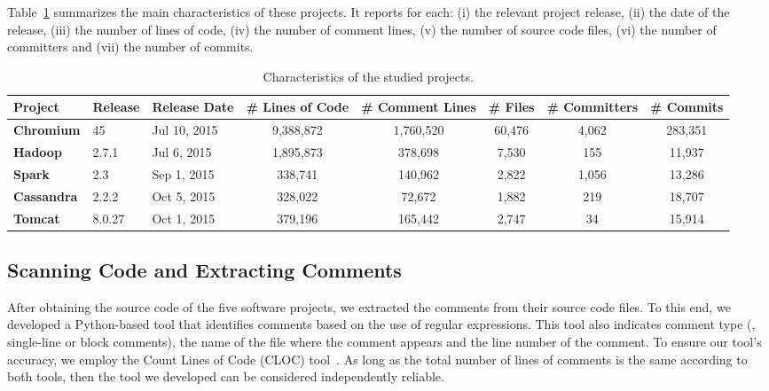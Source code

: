 Table~\ref{table:projects_statistics} summarizes the main characteristics of these projects. It reports for each: (i) the relevant project release, (ii) the date of the release, (iii) the number of lines of code, (iv)  the number of comment lines, (v)  the number of source code files, (vi)  the number of committers and (vii) the number of commits.

	
\begin{table}[t]


		\centering
		\caption{Characteristics of the studied projects.}
				\begin{adjustbox}{width=1.0\textwidth}
		\begin{tabular}{l|ll|ccccc}
			\hline
			\textbf{Project}  & \textbf{Release} & \textbf{ Release Date}  & \textbf{\# Lines of Code} & \textbf{\# Comment Lines} & \textbf{\# Files} & \textbf{\# Committers} & \textbf{\# Commits} \\ \hline
			\textbf{Chromium} &   45    & Jul 10, 2015 &  9,388,872   &    1,760,520    & 60,476 &    4,062    & 283,351  \\ \hline
			\textbf{Hadoop} &   2.7.1    & Jul 6, 2015 &  1,895,873   &    378,698    & 7,530 &    155    & 11,937  \\ \hline
			\textbf{Spark} &   2.3    & Sep 1, 2015 &  338,741   &    140,962    & 2,822 &    1,056    & 13,286  \\ \hline
			\textbf{Cassandra} &   2.2.2    & Oct 5, 2015 &  328,022   &    72,672    & 1,882 &    219    & 18,707  \\ \hline
			\textbf{Tomcat} &   8.0.27    & Oct 1, 2015 &  379,196   &    165,442    & 2,747 &    34    & 15,914  \\ \hline
		\end{tabular}
		\label{table:projects_statistics}
	\end{adjustbox}
\end{table}


\subsection{Scanning Code and Extracting Comments}
After obtaining the source code of the five software projects, we extracted the comments from their source code files. To this end, we developed a Python-based tool that identifies comments based on the use of regular expressions. This tool also indicates comment type (\ie{}, single-line or block comments), the name of the file where the comment appears and the line number of the comment. To ensure our tool's accuracy, we employ the Count Lines of Code (CLOC) tool~\cite{cloc}. As long as the total number of lines of comments is the same according to both tools, then the tool we developed can be considered independently reliable.

